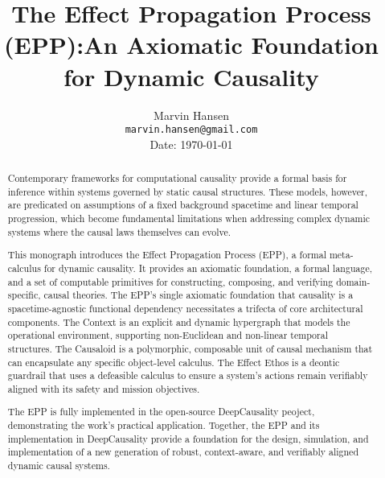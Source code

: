 \documentclass{article}
\title{The Effect Propagation Process (EPP):\newline An Axiomatic Foundation for Dynamic Causality}
\author{
  Marvin Hansen \\
  \texttt{marvin.hansen@gmail.com} \\
   Date: \today
}
\begin{document}
\maketitle

\begin{abstract}
Contemporary frameworks for computational causality provide a formal basis for inference within systems governed by static causal structures. These models, however, are predicated on assumptions of a fixed background spacetime and linear temporal progression, which become fundamental limitations when addressing complex dynamic systems where the causal laws themselves can evolve.

This monograph introduces the Effect Propagation Process (EPP), a formal meta-calculus for dynamic causality. It provides an axiomatic foundation, a formal language, and a set of computable primitives for constructing, composing, and verifying domain-specific, causal theories. The EPP's single axiomatic foundation that causality is a spacetime-agnostic functional dependency necessitates a trifecta of core architectural components. The Context is an explicit and dynamic hypergraph that models the operational environment, supporting non-Euclidean and non-linear temporal structures. The Causaloid is a polymorphic, composable unit of causal mechanism that can encapsulate any specific object-level calculus. The Effect Ethos is a  deontic guardrail that uses a defeasible calculus to ensure a system's actions remain verifiably aligned with its safety and mission objectives.

The EPP is fully implemented in the open-source DeepCausality peoject, demonstrating the work's practical application. Together, the EPP and its implementation in DeepCausality provide a foundation for the design, simulation, and implementation of a new generation of robust, context-aware, and verifiably aligned dynamic causal systems.

\end{abstract}

\newpage

\tableofcontents

\newpage








\end{document}
